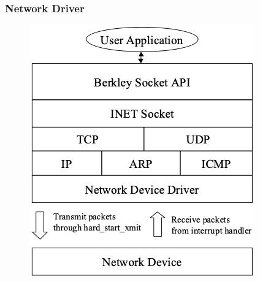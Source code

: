 % 
% 
\begin{frame}[fragile]
    \frametitle{Network Driver}
    \begin{figure}
    \includegraphics[width=0.8\linewidth]{figs/network-driver.png}
    \end{figure}
\end{frame}
% 
% 
